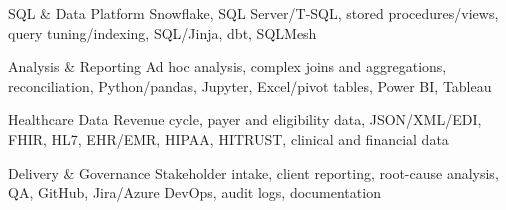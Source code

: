 
\begin{cvskills}    

  \cvskill
    {SQL \& Data Platform}
    {Snowflake, SQL Server/T-SQL, stored procedures/views, query tuning/indexing, SQL/Jinja, dbt, SQLMesh}

  \cvskill
    {Analysis \& Reporting}
    {Ad hoc analysis, complex joins and aggregations, reconciliation, Python/pandas, Jupyter, Excel/pivot tables, Power BI, Tableau}

  \cvskill
    {Healthcare Data}
    {Revenue cycle, payer and eligibility data, JSON/XML/EDI, FHIR, HL7, EHR/EMR, HIPAA, HITRUST, clinical and financial data}

  \cvskill
    {Delivery \& Governance}
    {Stakeholder intake, client reporting, root-cause analysis, QA, GitHub, Jira/Azure DevOps, audit logs, documentation}

\end{cvskills}